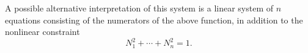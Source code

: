 \documentclass[12pt]{article}
\begin{document}
\begin{flushleft}
A possible alternative interpretation of this system is a linear system of $n$ equations consisting of the numerators of the above function, in addition to the nonlinear constraint 
\[N_1^2+\cdots+N_n^2=1.\]












































\end{flushleft}
\end{document}
